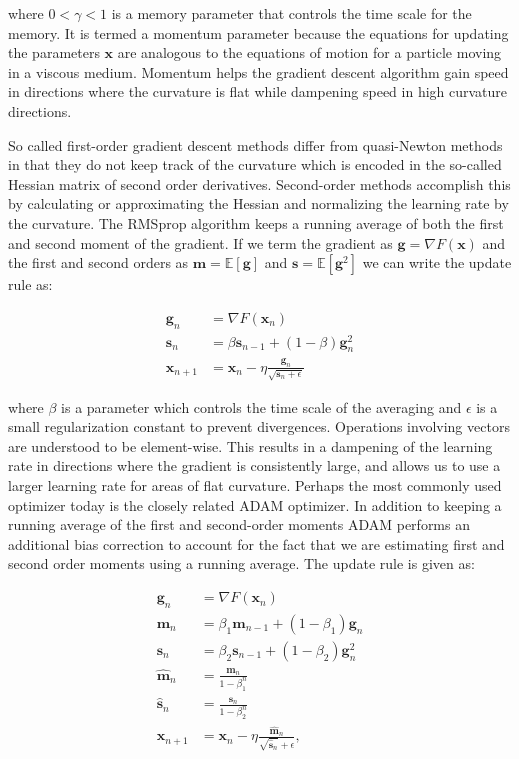 where $0 < \gamma < 1$ is a memory parameter
that controls the time scale for the memory.
It is termed a momentum parameter because the equations
for updating the parameters $\bm{x}$ are analogous to
the equations of motion for a particle moving
in a viscous medium. Momentum helps the gradient descent
algorithm gain speed in directions where the curvature
is flat while dampening speed in high curvature directions.
\par
So called first-order gradient descent methods differ from quasi-Newton methods
in that they do not keep track of the curvature which is encoded
in the so-called Hessian matrix of second order derivatives.
Second-order methods accomplish this by calculating or approximating
the Hessian and normalizing the learning rate by the curvature.
The RMSprop algorithm keeps a running average of both the
first and second moment of the gradient. If we term
the gradient as $\bm{g} = \nabla F(\bm{x})$
and the first and second orders as
$\bm{m} = \mathbb{E}[\bm{g}]$ and $\bm{s} = \mathbb{E}[\bm{g}^2]$
we can write the update rule as:

\begin{equation}
    \begin{split}
        \bm{g}_n &= \nabla F(\bm{x}_n) \\
        \bm{s}_n &= \beta \bm{s}_{n-1} + (1 - \beta)\bm{g}_{n}^2 \\
        \bm{x}_{n+1} &= \bm{x}_n - \eta \frac{\bm{g}_n}
        {\sqrt{\bm{s}_n + \epsilon}}
    \end{split}
\end{equation}

where $\beta$ is a parameter which controls the time scale
of the averaging and $\epsilon$ is a small regularization constant
to prevent divergences. Operations involving vectors are understood
to be element-wise. This results in a dampening of the learning rate
in directions where the gradient is consistently large,
and allows us to use a larger learning rate for areas
of flat curvature.
Perhaps the most commonly used optimizer today is the closely
related ADAM optimizer. In addition to keeping a running average
of the first and second-order moments ADAM performs
an additional bias correction to account for the 
fact that we are estimating first and second order moments
using a running average. The update rule is given as:

\begin{equation}
    \begin{split}
        \bm{g}_n &= \nabla F(\bm{x}_n) \\
        \bm{m}_n &= \beta_1 \bm{m}_{n-1} + (1 - \beta_1)\bm{g}_n \\
        \bm{s}_n &= \beta_2 \bm{s}_{n-1} + (1 - \beta_2)\bm{g}_n^2 \\
        \hat{\bm{m}}_n &= \frac{\bm{m}_n}{1 - \beta_1^n} \\
        \hat{\bm{s}}_n &= \frac{\bm{s}_n}{1 - \beta_2^n} \\
        \bm{x}_{n+1} &= \bm{x}_n - \eta \frac{\hat{\bm{m}}_n}
        {\sqrt{\hat{\bm{s}}_n} + \epsilon} ,
    \end{split}
\end{equation}

